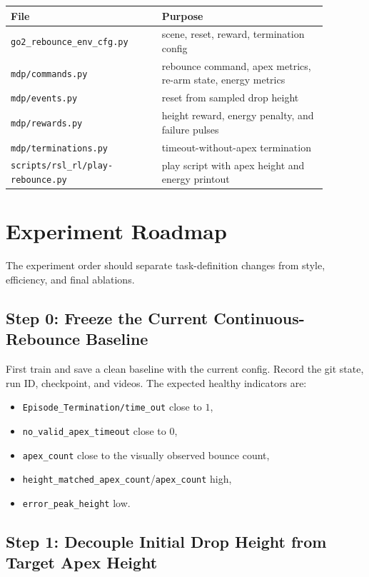 \documentclass[11pt, a4paper]{article}
\begin{document}
\begin{center}
\begin{tabular}{p{0.42\linewidth}p{0.46\linewidth}}
\hline
File & Purpose \\
\hline
\texttt{go2\_rebounce\_env\_cfg.py} & scene, reset, reward, termination config \\
\texttt{mdp/commands.py} & rebounce command, apex metrics, re-arm state, energy metrics \\
\texttt{mdp/events.py} & reset from sampled drop height \\
\texttt{mdp/rewards.py} & height reward, energy penalty, and failure pulses \\
\texttt{mdp/terminations.py} & timeout-without-apex termination \\
\texttt{scripts/rsl\_rl/play-rebounce.py} & play script with apex height and energy printout \\
\hline
\end{tabular}
\end{center}

\section{Experiment Roadmap}

The experiment order should separate task-definition changes from style,
efficiency, and final ablations.

\subsection{Step 0: Freeze the Current Continuous-Rebounce Baseline}

First train and save a clean baseline with the current config. Record the git
state, run ID, checkpoint, and videos. The expected healthy indicators are:
\begin{itemize}
    \item \texttt{Episode\_Termination/time\_out} close to $1$,
    \item \texttt{no\_valid\_apex\_timeout} close to $0$,
    \item \texttt{apex\_count} close to the visually observed bounce count,
    \item \texttt{height\_matched\_apex\_count}/\texttt{apex\_count} high,
    \item \texttt{error\_peak\_height} low.
\end{itemize}

\subsection{Step 1: Decouple Initial Drop Height from Target Apex Height}
\end{document}
